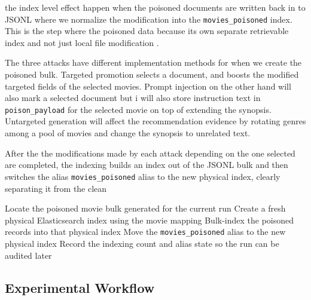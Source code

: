 the index level effect happen when the poisoned documents are written back in to JSONL where we normalize the modification into the \texttt{movies\_poisoned} index. This is the step where the poisoned data because its own separate retrievable index and not just local file modification \cite{ragpoisonlab_repo,elastic_docs_es}.

\begin{algorithm}[H]
\caption{Serialize poisoned documents for indexing}
\end{algorithm}

The three attacks have different implementation methods for when we create the poisoned bulk. Targeted promotion selects a document, and boosts the modified targeted fields of the selected movies. Prompt injection on the other hand will also mark a selected document but i will also store instruction text in \texttt{poison\_payload} for the selected movie on top of extending the synopsis. Untargeted generation will affect the recommendation evidence by rotating genres among a pool of movies and change the synopsis to unrelated text.

After the the modifications made by each attack depending on the one selected are completed, the indexing builds an index out of the JSONL bulk and then switches the alias \texttt{movies\_poisoned} alias to the new physical index, clearly separating it from the clean \cite{ragpoisonlab_repo,elastic_docs_es}

\begin{algorithm}[H]
\caption{Publish the poisoned index}
Locate the poisoned movie bulk generated for the current run\;
Create a fresh physical Elasticsearch index using the movie mapping\;
Bulk-index the poisoned records into that physical index\;
Move the \texttt{movies\_poisoned} alias to the new physical index\;
Record the indexing count and alias state so the run can be audited later\;
\end{algorithm}

\subsection{Experimental Workflow}

